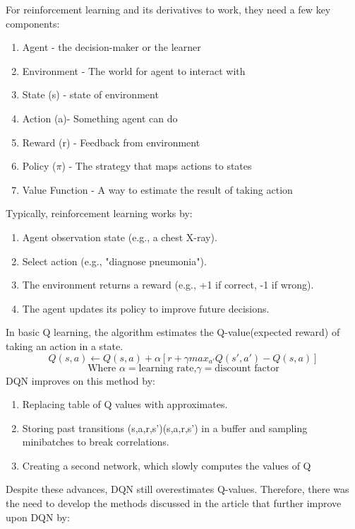 \documentclass{IEEEcsmag}
\begin{document}
    For reinforcement learning and its derivatives to work, they need a few key components:
    \begin{enumerate}
        \item Agent - the decision-maker or the learner
        \item Environment - The world for agent to interact with
        \item State (s) - state of environment
        \item Action (a)- Something agent can do
        \item Reward (r) - Feedback from environment
        \item Policy ($\pi$) - The strategy that maps actions to states
        \item Value Function - A way to estimate the result of taking action
    \end{enumerate}
    Typically, reinforcement learning works by:
    \begin{enumerate}
        \item Agent observation state (e.g., a chest X-ray).
        \item Select action (e.g., "diagnose pneumonia").
        \item The environment returns a reward (e.g., +1 if correct, -1 if wrong).
        \item The agent updates its policy to improve future decisions.
    \end{enumerate}
    In basic Q learning, the algorithm estimates the Q-value(expected reward) of taking an action in a state.
    \[
        Q(s,a) \leftarrow Q(s,a) + \alpha\left[r+\gamma max_{a'}Q(s',a') - Q(s,a)\right]
    \]
    \[
         \text{Where }\alpha = \text{learning rate,} \gamma = \text{discount factor}
    \]
    DQN improves on this method by:
    \begin{enumerate}
        \item Replacing table of Q values with approximates.
        \item Storing past transitions (s,a,r,s')(s,a,r,s') in a buffer and sampling minibatches to break correlations.
        \item Creating a second network, which slowly computes the values of Q
    \end{enumerate}
    Despite these advances, DQN still overestimates Q-values. 
    Therefore, there was the need to develop the methods discussed in the article that further improve upon DQN by:
\end{document}
